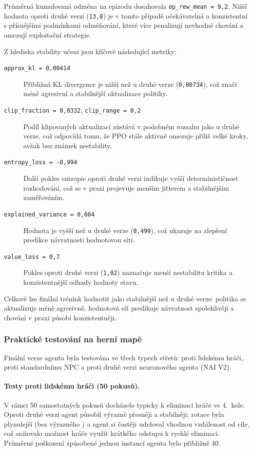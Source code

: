 Průměrná kumulovaná odměna na epizodu dosahovala \texttt{ep\_rew\_mean = 9{,}2}. Nižší hodnota oproti druhé verzi (\texttt{13{,}8}) je v tomto případě očekávatelná a konzistentní s přísnějšími podmínkami odměňování, které více penalizují nevhodné chování a omezují exploitační strategie.

Z hlediska stability učení jsou klíčové následující metriky:

\begin{description}
    \item[\texttt{approx\_kl = 0{,}00414}] Přibližná KL divergence je nižší než u druhé verze (\texttt{0{,}00734}), což značí méně agresivní a stabilnější aktualizace politiky.
    \item[\texttt{clip\_fraction = 0{,}0332}, \texttt{clip\_range = 0{,}2}] Podíl klipovaných aktualizací zůstává v podobném rozsahu jako u druhé verze, což odpovídá tomu, že PPO stále aktivně omezuje příliš velké kroky, avšak bez známek nestability.
    \item[\texttt{entropy\_loss = -0{,}994}] Další pokles entropie oproti druhé verzi indikuje vyšší determinističnost rozhodování, což se v praxi projevuje menším jitterem a stabilnějším zaměřováním.
    \item[\texttt{explained\_variance = 0{,}604}] Hodnota je vyšší než u druhé verze (\texttt{0{,}499}), což ukazuje na zlepšení predikce návratnosti hodnotovou sítí.
    \item[\texttt{value\_loss = 0{,}7}] Pokles oproti druhé verzi (\texttt{1{,}02}) naznačuje menší nestabilitu kritika a konzistentnější odhady hodnoty stavu.
\end{description}

Celkově lze finální trénink hodnotit jako stabilnější než u druhé verze: politika se aktualizuje méně agresivně, hodnotová síť predikuje návratnost spolehlivěji a chování v praxi působí konzistentněji.

\subsubsection{Praktické testování na herní mapě}

Finální verze agenta byla testována ve třech typech střetů: proti lidskému hráči, proti standardnímu NPC a proti druhé verzi neuronového agenta (NAI V2).

\paragraph{Testy proti lidskému hráči (50 pokusů).}
V rámci 50 samostatných pokusů docházelo typicky k eliminaci hráče ve 4.~kole. Oproti druhé verzi agent působil výrazně přesněji a stabilněji: rotace byla plynulejší (bez výrazného ) a agent si častěji udržoval vhodnou vzdálenost od cíle, což snižovalo možnost hráče využít krátkého odstupu k rychlé eliminaci. Průměrné poškození způsobené jednou instancí agenta bylo přibližně 40.

